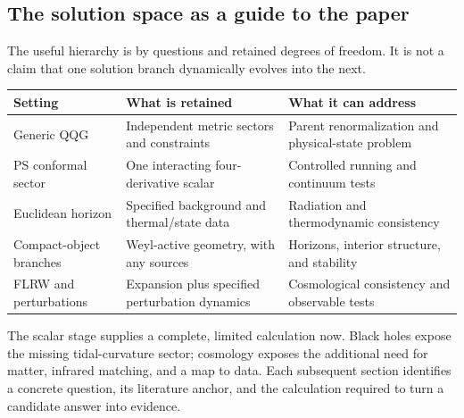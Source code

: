 \subsection{The solution space as a guide to the paper}

The useful hierarchy is by questions and retained degrees of freedom.  It is not a claim that one solution branch dynamically evolves into the next.
\begin{center}
\small
\begin{tabular}{p{}p{}p{}}
\toprule
Setting & What is retained & What it can address \\
\midrule
Generic QQG & Independent metric sectors and constraints & Parent renormalization and physical-state problem \\
PS conformal sector & One interacting four-derivative scalar & Controlled running and continuum tests \\
Euclidean horizon & Specified background and thermal/state data & Radiation and thermodynamic consistency \\
Compact-object branches & Weyl-active geometry, with any sources & Horizons, interior structure, and stability \\
FLRW and perturbations & Expansion plus specified perturbation dynamics & Cosmological consistency and observable tests \\
\bottomrule
\end{tabular}
\end{center}
The scalar stage supplies a complete, limited calculation now.  Black holes expose the missing tidal-curvature sector; cosmology exposes the additional need for matter, infrared matching, and a map to data.  Each subsequent section identifies a concrete question, its literature anchor, and the calculation required to turn a candidate answer into evidence.
